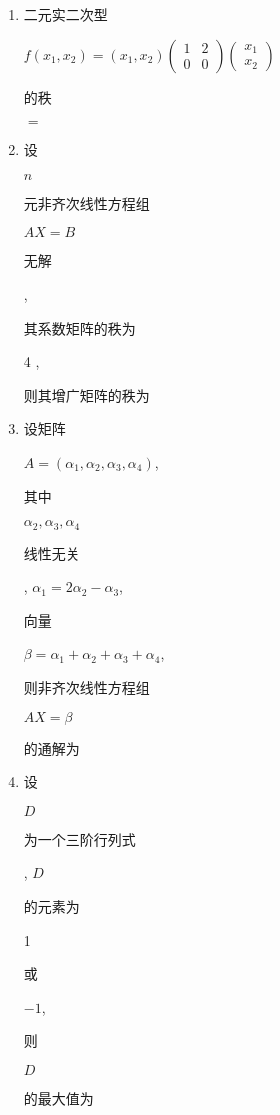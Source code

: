 \documentclass[10pt]{article}
\begin{document}
\begin{enumerate}
  \item \begin{CJK}{UTF8}{mj}二元实二次型\end{CJK} $f\left(x_{1}, x_{2}\right)=\left(x_{1}, x_{2}\right)\left(\begin{array}{ll}1 & 2 \\ 0 & 0\end{array}\right)\left(\begin{array}{l}x_{1} \\ x_{2}\end{array}\right)$ \begin{CJK}{UTF8}{mj}的秩\end{CJK} $=$

  \item \begin{CJK}{UTF8}{mj}设\end{CJK} $n$ \begin{CJK}{UTF8}{mj}元非齐次线性方程组\end{CJK} $A X=B$ \begin{CJK}{UTF8}{mj}无解\end{CJK}, \begin{CJK}{UTF8}{mj}其系数矩阵的秩为\end{CJK} 4 , \begin{CJK}{UTF8}{mj}则其增广矩阵的秩为\end{CJK}

  \item \begin{CJK}{UTF8}{mj}设矩阵\end{CJK} $A=\left(\alpha_{1}, \alpha_{2}, \alpha_{3}, \alpha_{4}\right)$, \begin{CJK}{UTF8}{mj}其中\end{CJK} $\alpha_{2}, \alpha_{3}, \alpha_{4}$ \begin{CJK}{UTF8}{mj}线性无关\end{CJK}, $\alpha_{1}=2 \alpha_{2}-\alpha_{3}$, \begin{CJK}{UTF8}{mj}向量\end{CJK} $\beta=\alpha_{1}+\alpha_{2}+\alpha_{3}+\alpha_{4}$, \begin{CJK}{UTF8}{mj}则非齐次线性方程组\end{CJK} $A X=\beta$ \begin{CJK}{UTF8}{mj}的通解为\end{CJK}

  \item \begin{CJK}{UTF8}{mj}设\end{CJK} $D$ \begin{CJK}{UTF8}{mj}为一个三阶行列式\end{CJK}, $D$ \begin{CJK}{UTF8}{mj}的元素为\end{CJK} 1 \begin{CJK}{UTF8}{mj}或\end{CJK} $-1$, \begin{CJK}{UTF8}{mj}则\end{CJK} $D$ \begin{CJK}{UTF8}{mj}的最大值为\end{CJK}

\end{enumerate}
\end{document}
